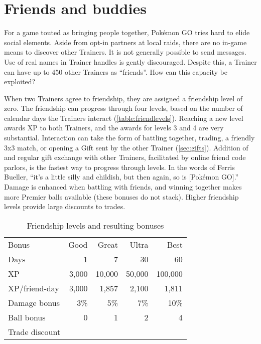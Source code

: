 \chapter{Friends and buddies}
\label{chap:friends}
For a game touted as bringing people together, Pokémon GO tries hard to elide social elements.
Aside from opt-in partners at local raids, there are no in-game means to discover other Trainers.
It is not generally possible to send messages.
Use of real names in Trainer handles is gently discouraged.
Despite this, a Trainer can have up to 450 other Trainers as ``friends''.
How can this capacity be exploited?

When two Trainers agree to friendship, they are assigned a friendship level of zero.
The friendship can progress through four levels, based on the number of calendar
  days the Trainers interact (\autoref{table:friendlevels}).
Reaching a new level awards XP to both Trainers, and the awards for levels 3 and 4 are very substantial.
Interaction can take the form of battling together, trading, a friendly 3x3 match, or
  opening a Gift sent by the other Trainer (\autoref{sec:gifts}).
Addition of and regular gift exchange with other Trainers, facilitated by online friend code parlors,
  is the fastest way to progress through levels.
In the words of Ferris Bueller, ``it's a little silly and childish, but then again, so is [Pokémon GO].''
Damage is enhanced when battling with friends, and winning together
  makes more Premier balls available (these bonuses do not stack).
Higher friendship levels provide large discounts to trades.
\begin{table}[hb]
\centering
\begin{tabular}{lrrrr}
Bonus & Good & Great & Ultra & Best\\
\Midrule
Days & 1 & 7 & 30 & 60\\
XP  & 3,000 & 10,000 & 50,000 & 100,000\\
XP/friend-day & 3,000 & 1,857 & 2,100 & 1,811\\
Damage bonus & 3\% & 5\% & 7\% & 10\%\\
Ball bonus & 0 & 1 & 2 & 4\\
Trade discount & & & & \\
\end{tabular}
\caption{Friendship levels and resulting bonuses}
\label{table:friendlevels}
\end{table}

